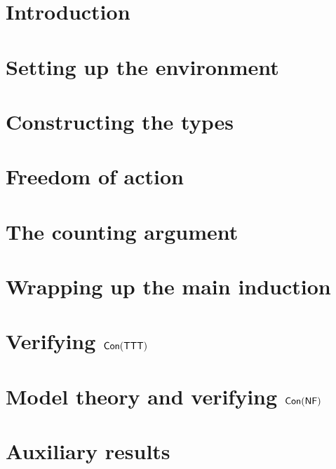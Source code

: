 \chapter{Introduction}
\label{c:introduction}


\chapter{Setting up the environment}
\label{c:environment}


\chapter{Constructing the types}
\label{c:construction}


\chapter{Freedom of action}
\label{c:foa}


\chapter{The counting argument}
\label{c:counting}


\chapter{Wrapping up the main induction}
\label{c:induction}


\chapter{Verifying \texorpdfstring{\( \operatorname{\mathsf{Con}}(\mathsf{TTT}) \)}{Con(TTT)}}
\label{c:model}


\chapter{Model theory and verifying \texorpdfstring{\( \operatorname{\mathsf{Con}}(\mathsf{NF}) \)}{Con(NF)}}
\label{c:model_theory}


\appendix
\chapter{Auxiliary results}
\label{c:auxiliary}




